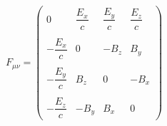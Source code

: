 \documentclass[preview]{standalone}
\begin{document}
\begin{align*}
F_{\mu\nu} = \begin{pmatrix} 0 & \dfrac{E_{x}}{c} & \dfrac{E_{y}}{c} & \dfrac{E_{z}}{c} \\ \
                          &&& \\ -\dfrac{E_{x}}{c} & 0 & - B_{z} & B_{y} \\ \
                          &&& \\ -\dfrac{E_{y}}{c} &  B_{z} & 0 & - B_{x} \\ &&& \\ -\dfrac{E_{z}}{c} &  -B_{y} & B_{x} & 0 \end{pmatrix}
\end{align*}
\end{document}
